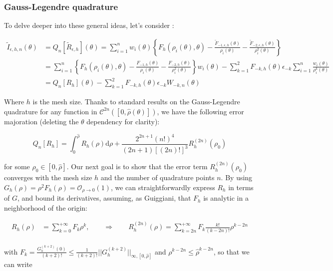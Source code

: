 ﻿\documentclass{article}
\begin{document}
\subsubsection{Gauss-Legendre quadrature}

To delve deeper into these general ideas, let's consider :

\begin{align}
  \widetilde I_{\epsilon,h,n}(\theta) & = Q_n[\widetilde R_{\epsilon, h}](\theta) = \sum_{i=1}^{n} w_i(\theta) \left\{F_h(\rho_i(\theta), \theta) - \frac{\widetilde F_{-1, \epsilon, h}(\theta)}{\rho_i(\theta)} - \frac{\widetilde F_{-2, \epsilon, h}(\theta)}{\rho_i^2(\theta)}\right\} \\
& = \sum_{i=1}^{n}\left\{F_h(\rho_i(\theta), \theta) - \frac{F_{-1, h}(\theta)}{\rho_i(\theta)} - \frac{F_{-2, h}(\theta)}{\rho_i^2(\theta)}\right\}w_i(\theta) - \sum_{k=1}^{2}F_{-k, h}(\theta)\epsilon_{-k}\sum_{i=1}^{n}\frac{w_i(\theta)}{\rho_i^k(\theta)} \\
& = Q_n[R_h](\theta) - \sum_{k=1}^{2}F_{-k, h}(\theta)\epsilon_{-k}W_{-k,n}(\theta)
\end{align}

Where $h$ is the mesh size. Thanks to standard results on the Gauss-Legendre quadrature for any function in $\mathcal C^{2n}([0, \hat\rho(\theta)])$, we have the following error majoration (deleting the $\theta$ dependency for clarity):

\begin{equation}
  Q_n[R_h] = \int_{0}^{\hat\rho}R_h(\rho)\mathrm d\rho + \frac{2^{2n+1}(n!)^4}{(2n+1)[(2n)!]^3}R_h^{(2n)}(\rho_0)
\end{equation}

for some $\rho_0 \in [0, \hat\rho]$. Our next goal is to show that the error term $R_h^{(2n)}(\rho_0)$ converges with the mesh size $h$ and the number of quadrature points $n$. By using $G_h(\rho) = \rho^2 F_h(\rho) = \mathcal O_{\rho\to 0}(1)$, we can straightforwardly express $R_h$ in terms of $G$, and bound its derivatives, assuming, as Guiggiani, that $F_h$ is analytic in a neighborhood of the origin:

\begin{align}
  R_h(\rho) & = \sum_{k=0}^{+\infty}F_k\rho^k, \qquad \Longrightarrow \qquad R_h^{(2n)}(\rho) = \sum_{k=2n}^{+\infty}F_k\frac{k!}{(k-2n)!}\rho^{k-2n} \\
\end{align}

with $\displaystyle{F_k = \frac{G_h^{(k+2)}(0)}{(k+2)!} \leq \frac{1}{(k+2)!}||G_h^{(k+2)}||_{\infty, [0, \hat\rho]}}$ and $\rho^{k-2n} \leq \hat\rho^{k-2n}$, so that we can write
\end{document}
